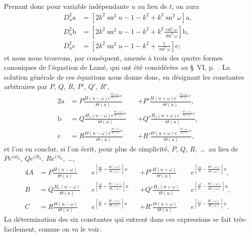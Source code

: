 \documentclass[11pt,leqno,oneside,letterpaper]{book}[2005/09/16]
\DeclareMathOperator{\sn}{sn}
\DeclareMathOperator{\cn}{cn}
\DeclareMathOperator{\dn}{dn}
\begin{document}
Prenant donc pour variable ind\'ependante $u$ au lieu de $t$, on aura
\begin{align*}
D^2_u\mathrm{a} & = \left[2k^2{\sn}^2u-1-k^2+k^2{\sn}^2\omega\right]\mathrm{a},\\
D^2_u\mathrm{b} & = \left[2k^2{\sn}^2u-1-k^2+k^2\frac{\cn^2\omega}{\dn^2\omega}\right] \mathrm{b},\\
D^2_u\mathrm{c} & = \left[2k^2{\sn}^2u-1-k^2 + \frac{1}{\sn^2\omega}\right]\mathrm{c};
\end{align*}
et nous nous trouvons, par cons\'equent, amen\'es \`a trois des quatre formes
canoniques de l'\'equation de Lam\'e, qui ont \'et\'e consid\'er\'ees au \S~VI, p.~\pageref{page14}.
La solution g\'en\'erale de ces \'equations nous donne donc, en d\'esignant les
constantes arbitraires par $P$, $Q$, $R$, $P'$, $Q'$, $R'$,
\begin{alignat*}{2}
\mathrm{a} & = P\frac{H(u-\omega) e^{\frac{\Theta'(\omega)}{\Theta(\omega)}u}}{\Theta(u)} &&+
P'\frac{H(u+\omega) e^{-\frac{\Theta'(\omega)}{\Theta(\omega)}u}}{\Theta(u)},\\
\mathrm{b} & = Q\frac{H_1(u-\omega) e^{\frac{\Theta'_1(\omega)}{\Theta_1(\omega)}u}}{\Theta(u)} &&+
Q'\frac{H_1(u+\omega) e^{-\frac{\Theta'_1(\omega)}{\Theta_1(\omega)}u}}{\Theta(u)},\\
\mathrm{c} & = R\frac{\Theta(u-\omega) e^{\frac{H'(\omega)}{H(\omega)}u}}{\Theta(u)} &&+
R'\frac{\Theta(u+\omega) e^{-\frac{H'(\omega)}{H(\omega)}u}}{\Theta(u)},
\end{alignat*}
et l'on en conclut, si l'on \'ecrit, pour plus de simplicit\'e, $P$, $Q$,
$R$,~\ldots\ au lieu de $Pe^{i\alpha t_0}$, $Qe^{i\beta t_0}$,
$Re^{i\gamma t_0}$,~\ldots,
\begin{alignat*}{4}
  A &= P \frac{H(u-\omega)}{\Theta(u)}
&&       e^{\left[ \frac{i\alpha}{n}
               + \frac{\Theta'(\omega)}{\Theta(\omega)} \right]u}
&&     + P'\frac{H(u+\omega)}{\Theta(u)}
&&       e^{\left[ \frac{i\alpha}{n}
               - \frac{\Theta'(\omega)}{\Theta(\omega)} \right]u},
\\
  B &= Q \frac{H_1(u-\omega)}{\Theta(u)}
&&       e^{\left[ \frac{i \beta}{n}
               + \frac{\Theta_1'(\omega)}{\Theta_1(\omega)} \right]u}
&&     + Q'\frac{H_1(u+\omega)}{\Theta(u)}
&&       e^{\left[ \frac{i \beta}{n}
               - \frac{\Theta_1'(\omega)}{\Theta_1(\omega)} \right]u},
\\
  C &= R \frac{\Theta(u-\omega)}{\Theta(u)}
&&       e^{\left[ \frac{i\gamma}{n}
               + \frac{H'(\omega)}{H(\omega)} \right]u}
&&     + R'\frac{\Theta(u+\omega)}{\Theta(u)}
&&       e^{\left[ \frac{i\gamma}{n}
               - \frac{H'(\omega)}{H(\omega)} \right]u}.
\end{alignat*}
La d\'etermination des six constantes qui entrent dans ces expressions se fait
tr\`es-facilement, comme on va le voir.
\end{document}
